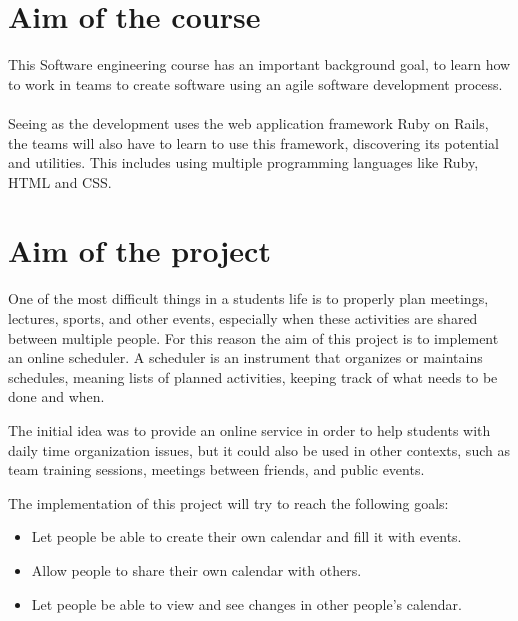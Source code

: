 
\label{Introduction}

\section{Aim of the course}
\vspace{-5mm}
This Software engineering course has an important background goal, to learn how to work in teams to create software using an agile software development process.\\ \\
Seeing as the development uses the web application framework Ruby on Rails, the teams will also have to learn to use this framework, discovering its potential and utilities. This includes using multiple programming languages like Ruby, HTML and CSS.

\section{Aim of the project}
\vspace{-5mm}
One of the most difficult things in a students life is to properly plan meetings, lectures, sports, and other events, especially when these activities are shared between multiple people. For this reason the aim of this project is to implement an online scheduler. A scheduler is an instrument that organizes or maintains schedules, meaning lists of planned activities, keeping track of what needs to be done and when.

The initial idea was to provide an online service in order to help students with daily time organization issues, but it could also be used in other contexts, such as team training sessions, meetings between friends, and public events.

The implementation of this project will try to reach the following goals:
\vspace{-5mm}
\begin{itemize}
	\setlength{\itemsep}{-5pt}
	\item Let people be able to create their own calendar and fill it with events.
	\item Allow people to share their own calendar with others.
	\item Let people be able to view and see changes in other people's calendar.
\end{itemize}